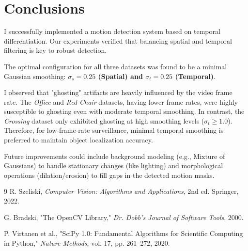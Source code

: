 \documentclass[11pt, twocolumn]{article}
\begin{document}
\section{Conclusions}
I successfully implemented a motion detection system based on temporal differentiation. Our experiments verified that balancing spatial and temporal filtering is key to robust detection. 

The optimal configuration for all three datasets was found to be a minimal Gaussian smoothing: \textbf{$\sigma_s=0.25$ (Spatial) and $\sigma_t=0.25$ (Temporal)}. 

I observed that "ghosting" artifacts are heavily influenced by the video frame rate. The \textit{Office} and \textit{Red Chair} datasets, having lower frame rates, were highly susceptible to ghosting even with moderate temporal smoothing. In contrast, the \textit{Crossing} dataset only exhibited ghosting at high smoothing levels ($\sigma_t \ge 1.0$). Therefore, for low-frame-rate surveillance, minimal temporal smoothing is preferred to maintain object localization accuracy.

Future improvements could include background modeling (e.g., Mixture of Gaussians) to handle stationary changes (like lighting) and morphological operations (dilation/erosion) to fill gaps in the detected motion masks.

\begin{thebibliography}{9}
R. Szeliski, \textit{Computer Vision: Algorithms and Applications}, 2nd ed. Springer, 2022.

G. Bradski, "The OpenCV Library," \textit{Dr. Dobb's Journal of Software Tools}, 2000.

P. Virtanen et al., "SciPy 1.0: Fundamental Algorithms for Scientific Computing in Python," \textit{Nature Methods}, vol. 17, pp. 261–272, 2020.
\end{thebibliography}
\end{document}
